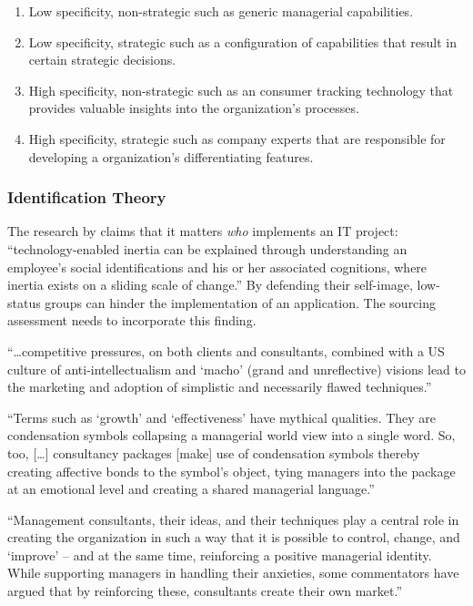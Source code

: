 \documentclass[12pt]{article}
\providecommand{\tightlist}{%
  \setlength{\itemsep}{0pt}\setlength{\parskip}{0pt}}
\begin{document}
\begin{enumerate}
\def\labelenumi{\arabic{enumi}.}
\tightlist
\item
  Low specificity, non-strategic such as generic managerial
  capabilities.
\item
  Low specificity, strategic such as a configuration of capabilities
  that result in certain strategic decisions.
\item
  High specificity, non-strategic such as an consumer tracking
  technology that provides valuable insights into the organization's
  processes.
\item
  High specificity, strategic such as company experts that are
  responsible for developing a organization's differentiating features.
\end{enumerate}

\hypertarget{identification-theory}{%
\subsubsection{Identification Theory}\label{identification-theory}}

The research by \citet[311-313]{schwarz2005} claims that it matters
\emph{who} implements an IT project: ``technology-enabled inertia can be
explained through understanding an employee's social identifications and
his or her associated cognitions, where inertia exists on a sliding
scale of change.'' By defending their self-image, low-status groups can
hinder the implementation of an application. The sourcing assessment
needs to incorporate this finding.

``\ldots competitive pressures, on both clients and consultants,
combined with a US culture of anti-intellectualism and `macho' (grand
and unreflective) visions lead to the marketing and adoption of
simplistic and necessarily flawed techniques.'' \citep[ 34]{sturdy1998}

``Terms such as `growth' and `effectiveness' have mythical qualities.
They are condensation symbols collapsing a managerial world view into a
single word. So, too, {[}\ldots{]} consultancy packages {[}make{]} use
of condensation symbols thereby creating affective bonds to the symbol's
object, tying managers into the package at an emotional level and
creating a shared managerial language.'' \citep[ 290]{gill1993}

``Management consultants, their ideas, and their techniques play a
central role in creating the organization in such a way that it is
possible to control, change, and `improve' -- and at the same time,
reinforcing a positive managerial identity. While supporting managers in
handling their anxieties, some commentators have argued that by
reinforcing these, consultants create their own market.'' \citep[
48]{werr2002}
\end{document}
